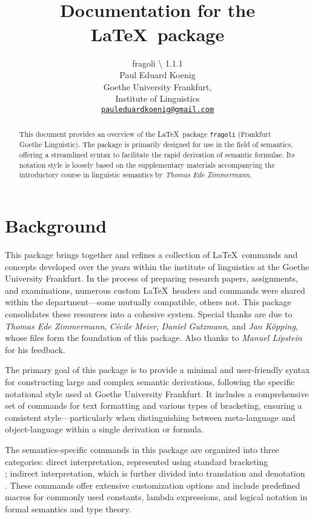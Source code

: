 \documentclass[10pt, a4paper]{article}
\title{\FraGoLi\\Documentation for the \LaTeX\ package \texttt{\her{fragoli}}}
\author{fragoli \textbackslash\text{v} 1.1.1\\Paul Eduard Koenig\\Goethe University Frankfurt,\\Institute of Linguistics\\\texttt{\href{mailto:pauleduardkoenig@gmail.com}{pauleduardkoenig@gmail.com}}}
\begin{document}
	\maketitle
	\begin{abstract}
		This document provides an overview of the \LaTeX\ package \texttt{fragoli} (Frankfurt Goethe Linguistic). The package is primarily designed for use in the field of semantics, offering a streamlined syntax to facilitate the rapid derivation of semantic formulae. Its notation style is loosely based on the supplementary materials accompanying the introductory course in linguistic semantics by \textit{Thomas Ede Zimmermann}.
	\end{abstract}
	\tableofcontents
	\section{Background}
	This package brings together and refines a collection of \LaTeX\ commands and concepts developed over the years within the institute of linguistics at the Goethe University Frankfurt. In the process of preparing research papers, assignments, and examinations, numerous custom \LaTeX\ headers and commands were shared within the department—some mutually compatible, others not. This package consolidates these resources into a cohesive system. Special thanks are due to \textit{Thomas Ede Zimmermann}, \textit{C\'{e}cile Meier}, \textit{Daniel Gutzmann}, and \textit{Jan Köpping}, whose files form the foundation of this package. Also thanks to \textit{Manuel Lipstein} for his feedback. 
	
	The primary goal of this package is to provide a minimal and user-friendly syntax for constructing large and complex semantic derivations, following the specific notational style used at Goethe University Frankfurt. It includes a comprehensive set of commands for text formatting and various types of bracketing, ensuring a consistent style—particularly when distinguishing between meta-language and object-language within a single derivation or formula.
	
	The semantics-specific commands in this package are organized into three categories: direct interpretation, represented using standard bracketing \\; indirect interpretation, which is further divided into translation  and denotation . These commands offer extensive customization options and include predefined macros for commonly used constants, lambda expressions, and logical notation in formal semantics and type theory.
	
\end{document}
